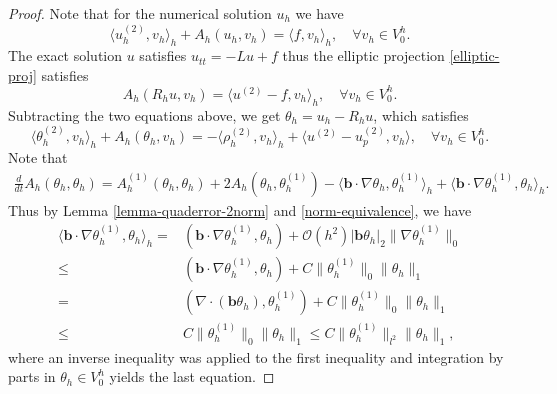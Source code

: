 \documentclass[onefignum,onetabnum]{siamart171218}
\begin{document}
\begin{proof}
Note  that  for  the  numerical solution $u_h$ we have
\begin{equation}
\langle  u_h^{(2)}, v_h \rangle_h + A_h(u_h, v_h) = \langle f, v_h \rangle_h,\quad  \forall v_h \in V^h_0.
\end{equation} 
The exact solution $u$ satisfies $u_{tt}=-Lu+f$ thus the elliptic projection \eqref{elliptic-proj} satisfies
\[A_h(R_h u,v_h) = \langle u^{(2)}-f,v_h \rangle_h,\quad \forall v_h\in V^h_0.\]
Subtracting the two equations above, we get $ \theta_h=u_h-R_hu$, which satisfies 
\begin{equation}\label{theta-eqn-1}
\langle \theta_h^{(2)}, v_h \rangle_h + A_h(\theta_h, v_h) = -\langle \rho_h^{(2)},  v_h\rangle_h + 
\langle u^{(2)}-u^{(2)}_p,v_h \rangle,\quad \forall v_h \in V^h_0.
\end{equation}
 Note  that  
\begin{align}\label{dt-bilinear-form}
\frac{d}{dt}A_h(\theta_h,\theta_h) = A^{(1)}_{h}(\theta_h, \theta_h)+2A_h(\theta_h,\theta_h^{(1)})- \langle  \mathbf b\cdot\nabla\theta_h ,\theta_h^{(1)}\rangle_h + \langle  \mathbf b\cdot\nabla\theta_h^{(1)} ,\theta_h\rangle_h.
\end{align}
Thus by Lemma \ref{lemma-quaderror-2norm} and \eqref{norm-equivalence}, we have 
\begin{equation}\label{extra-convection-estimate}
\begin{aligned}
\langle  \mathbf b\cdot\nabla\theta_h^{(1)} ,\theta_h\rangle_h
= & (\mathbf b \cdot \nabla \theta_h^{(1)}, \theta_h) + \mathcal O(h^2)|\mathbf b \theta_h|_2\|\nabla  \theta_h^{(1)}\|_0 \\
\leq & (\mathbf b \cdot \nabla \theta_h^{(1)}, \theta_h) + C\| \theta_h^{(1)}\|_0\|\theta_h\|_1\\
= & (\nabla \cdot(\mathbf b \theta_h),\theta_h^{(1)}) + C\| \theta_h^{(1)}\|_0\|\theta_h\|_1\\
\leq & C \| \theta_h^{(1)}\|_0\|\theta_h\|_1\leq  C \| \theta_h^{(1)}\|_{l^2}\|\theta_h\|_1,
\end{aligned}
\end{equation}
where  an  inverse inequality  was applied to the first inequality and integration by parts in  $\theta_h\in V_0^h$  yields   the last equation. 


\end{proof}
\end{document}
